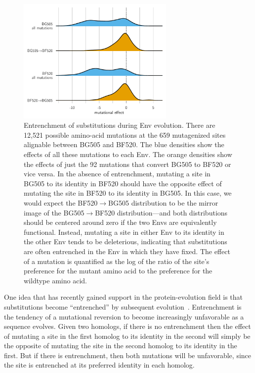 \documentclass[9pt]{elife}
\begin{document}
\begin{figure}
\centerline{\includegraphics[clip=true, trim=0in 0in 0in 0in, width=0.68\textwidth]{figures/entrenchment.pdf}}
\caption{\label{fig:entrenchment}
Entrenchment of substitutions during Env evolution.
There are 12,521 possible amino-acid mutations at the 659 mutagenized sites alignable between BG505 and BF520.
The blue densities show the effects of all these mutations to each Env.
The orange densities show the effects of just the 92 mutations that convert BG505 to BF520 or vice versa.
In the absence of entrenchment, mutating a site in BG505 to its identity in BF520 should have the opposite effect of mutating the site in BF520 to its identity in BG505.
In this case, we would expect the BF520$\rightarrow$BG505 distribution to be the mirror image of the BG505$\rightarrow$BF520 distribution---and both distributions should be centered around zero if the two Envs are equivalently functional.
Instead, mutating a site in either Env to its identity in the other Env tends to be deleterious, indicating that substitutions are often entrenched in the Env in which they have fixed.
The effect of a mutation is quantified as the log of the ratio of the site's preference for the mutant amino acid to the preference for the wildtype amino acid.
}
\end{figure}

One idea that has recently gained support in the protein-evolution field is that substitutions become ``entrenched'' by subsequent evolution~\citep{pollock2012amino,shah2015contingency,starr2017pervasive}.
Entrenchment is the tendency of a mutational reversion to become increasingly unfavorable as a sequence evolves.
Given two homologs, if there is no entrenchment then the effect of mutating a site in the first homolog to its identity in the second will simply be the opposite of mutating the site in the second homolog to its identity in the first.
But if there is entrenchment, then both mutations will be unfavorable, since the site is entrenched at its preferred identity in each homolog.
\end{document}
